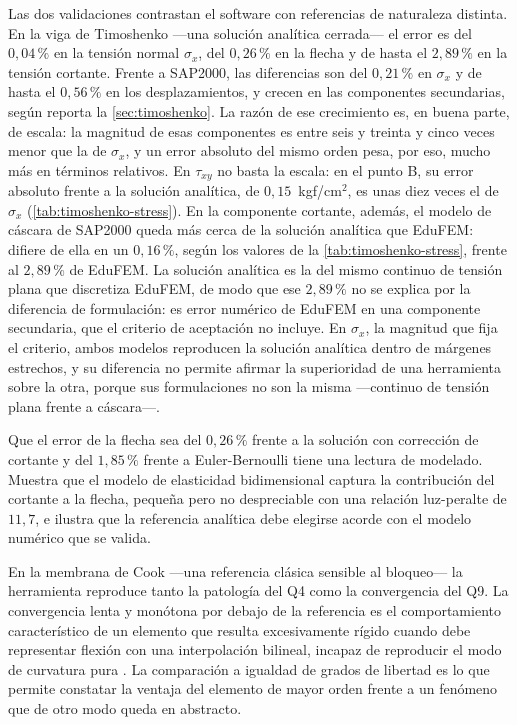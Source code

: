 Las dos validaciones contrastan el software con referencias de naturaleza distinta. En la viga de Timoshenko —una solución analítica cerrada— el error es del $0{,}04\,\%$ en la tensión normal $\sigma_x$, del $0{,}26\,\%$ en la flecha y de hasta el $2{,}89\,\%$ en la tensión cortante. Frente a SAP2000, las diferencias son del $0{,}21\,\%$ en $\sigma_x$ y de hasta el $0{,}56\,\%$ en los desplazamientos, y crecen en las componentes secundarias, según reporta la \autoref{sec:timoshenko}. La razón de ese crecimiento es, en buena parte, de escala: la magnitud de esas componentes es entre seis y treinta y cinco veces menor que la de $\sigma_x$, y un error absoluto del mismo orden pesa, por eso, mucho más en términos relativos. En $\tau_{xy}$ no basta la escala: en el punto B, su error absoluto frente a la solución analítica, de $0{,}15$~kgf/cm$^2$, es unas diez veces el de $\sigma_x$ (\autoref{tab:timoshenko-stress}). En la componente cortante, además, el modelo de cáscara de SAP2000 queda más cerca de la solución analítica que EduFEM: difiere de ella en un $0{,}16\,\%$, según los valores de la \autoref{tab:timoshenko-stress}, frente al $2{,}89\,\%$ de EduFEM. La solución analítica es la del mismo continuo de tensión plana que discretiza EduFEM, de modo que ese $2{,}89\,\%$ no se explica por la diferencia de formulación: es error numérico de EduFEM en una componente secundaria, que el criterio de aceptación no incluye. En $\sigma_x$, la magnitud que fija el criterio, ambos modelos reproducen la solución analítica dentro de márgenes estrechos, y su diferencia no permite afirmar la superioridad de una herramienta sobre la otra, porque sus formulaciones no son la misma ---continuo de tensión plana frente a cáscara---.

Que el error de la flecha sea del $0{,}26\,\%$ frente a la solución con corrección de cortante y del $1{,}85\,\%$ frente a Euler-Bernoulli tiene una lectura de modelado. Muestra que el modelo de elasticidad bidimensional captura la contribución del cortante a la flecha, pequeña pero no despreciable con una relación luz-peralte de $11{,}7$, e ilustra que la referencia analítica debe elegirse acorde con el modelo numérico que se valida.

En la membrana de Cook —una referencia clásica sensible al bloqueo— la herramienta reproduce tanto la patología del Q4 como la convergencia del Q9. La convergencia lenta y monótona por debajo de la referencia es el comportamiento característico de un elemento que resulta excesivamente rígido cuando debe representar flexión con una interpolación bilineal, incapaz de reproducir el modo de curvatura pura \autocites[pp.~98-99]{cook2002concepts}[p.~476]{bathe2014fem}. La comparación a igualdad de grados de libertad es lo que permite constatar la ventaja del elemento de mayor orden frente a un fenómeno que de otro modo queda en abstracto.

